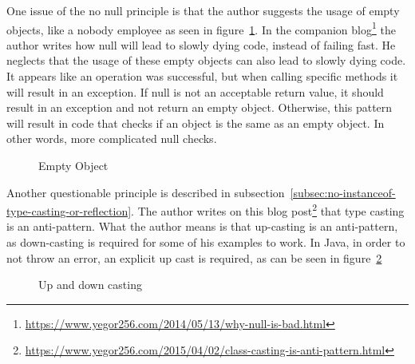
One issue of the no null principle is that the author suggests the usage of empty objects, like a nobody employee as seen in figure\ \ref{fig:empty-object}.
In the companion blog\footnote{\url{https://www.yegor256.com/2014/05/13/why-null-is-bad.html}} the author writes how null will lead to slowly dying code, instead of failing fast.
He neglects that the usage of these empty objects can also lead to slowly dying code.
It appears like an operation was successful, but when calling specific methods it will result in an exception.
If null is not an acceptable return value, it should result in an exception and not return an empty object.
Otherwise, this pattern will result in code that checks if an object is the same as an empty object.
In other words, more complicated null checks.

\begin{figure}[h]
    \caption{Empty Object}
    \label{fig:empty-object}
\end{figure}

Another questionable principle is described in subsection\ \ref{subsec:no-instanceof-type-casting-or-reflection}.
The author writes on this blog post\footnote{\url{https://www.yegor256.com/2015/04/02/class-casting-is-anti-pattern.html}} that type casting is an anti-pattern.
What the author means is that up-casting is an anti-pattern, as down-casting is required for some of his examples to work.
In Java, in order to not throw an error, an explicit up cast is required, as can be seen in figure\ \ref{fig:up-and-down-casting}

\begin{figure}[h]
    \caption{Up and down casting}
    
    \label{fig:up-and-down-casting}
\end{figure}